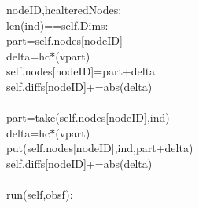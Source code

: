 {{\begin{tabbing}
\hspace{6pt}nodeID,hc\hspace{6pt}alteredNodes:\\
\hspace{6pt}len(ind)\hspace{6pt}==\hspace{6pt}self.Dims:\\
\hspace{96pt}part\hspace{6pt}=\hspace{6pt}self.nodes{[}nodeID{]}\\
\hspace{96pt}delta\hspace{6pt}=\hspace{6pt}hc$\ast$(v\dash{}part)\\
\hspace{96pt}self.nodes{[}nodeID{]}\hspace{6pt}=\hspace{6pt}part+delta\\
\hspace{96pt}self.diffs{[}nodeID{]}\hspace{6pt}+=\hspace{6pt}abs(delta)\\
\\
\hspace{96pt}part\hspace{6pt}=\hspace{6pt}take(self.nodes{[}nodeID{]},ind)\\
\hspace{96pt}delta\hspace{6pt}=\hspace{6pt}hc$\ast$(v\dash{}part)\\
\hspace{96pt}put(self.nodes{[}nodeID{]},ind,part+delta)\\
\hspace{96pt}self.diffs{[}nodeID{]}\hspace{6pt}+=\hspace{6pt}abs(delta)\\
\\
\hspace{6pt}run(self,obsf):\\

\end{tabbing}}}
